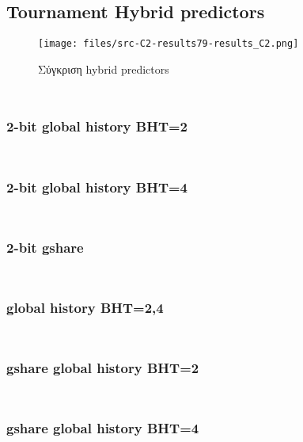 \documentclass[a4paper,12pt]{article}
\begin{document}
\subsection*{Tournament Hybrid predictors}

\begin{figure}[H]
	\centering
	\texttt{[image: files/src-C2-results79-results\_C2.png]}
	\caption{Σύγκριση hybrid predictors}
	\label{fig:C2}
\end{figure}

\inputminted[linenos,fontsize=\scriptsize,frame=leftline]{cpp}{files/src-C2-hybrid_predictor.h}
\inputminted[linenos,fontsize=\scriptsize,frame=leftline]{cpp}{files/src-C2-hybrid_predictor.cpp}

\subsubsection*{2-bit global history BHT=2}
\inputminted[linenos,fontsize=\scriptsize,frame=leftline]{cpp}{files/src-C2-hybrid_2bit_GH2_predictor.cpp}
\inputminted[linenos,fontsize=\scriptsize,frame=leftline]{cpp}{files/src-C2-hybrid_2bit_GH2_predictor.h}

\subsubsection*{2-bit global history BHT=4}
\inputminted[linenos,fontsize=\scriptsize,frame=leftline]{cpp}{files/src-C2-hybrid_2bit_GH4_predictor.cpp}
\inputminted[linenos,fontsize=\scriptsize,frame=leftline]{cpp}{files/src-C2-hybrid_2bit_GH4_predictor.h}

\subsubsection*{2-bit gshare}
\inputminted[linenos,fontsize=\scriptsize,frame=leftline]{cpp}{files/src-C2-hybrid_2bit_GS_predictor.cpp}
\inputminted[linenos,fontsize=\scriptsize,frame=leftline]{cpp}{files/src-C2-hybrid_2bit_GS_predictor.h}

\subsubsection*{global history BHT=2,4}
\inputminted[linenos,fontsize=\scriptsize,frame=leftline]{cpp}{files/src-C2-hybrid_GH2_GH4_predictor.cpp}
\inputminted[linenos,fontsize=\scriptsize,frame=leftline]{cpp}{files/src-C2-hybrid_GH2_GH4_predictor.h}

\subsubsection*{gshare global history BHT=2}
\inputminted[linenos,fontsize=\scriptsize,frame=leftline]{cpp}{files/src-C2-hybrid_GS_GH2_predictor.cpp}
\inputminted[linenos,fontsize=\scriptsize,frame=leftline]{cpp}{files/src-C2-hybrid_GS_GH2_predictor.h}

\subsubsection*{gshare global history BHT=4}
\inputminted[linenos,fontsize=\scriptsize,frame=leftline]{cpp}{files/src-C2-hybrid_GS_GH4_predictor.cpp}
\inputminted[linenos,fontsize=\scriptsize,frame=leftline]{cpp}{files/src-C2-hybrid_GS_GH4_predictor.h}


\end{document}
